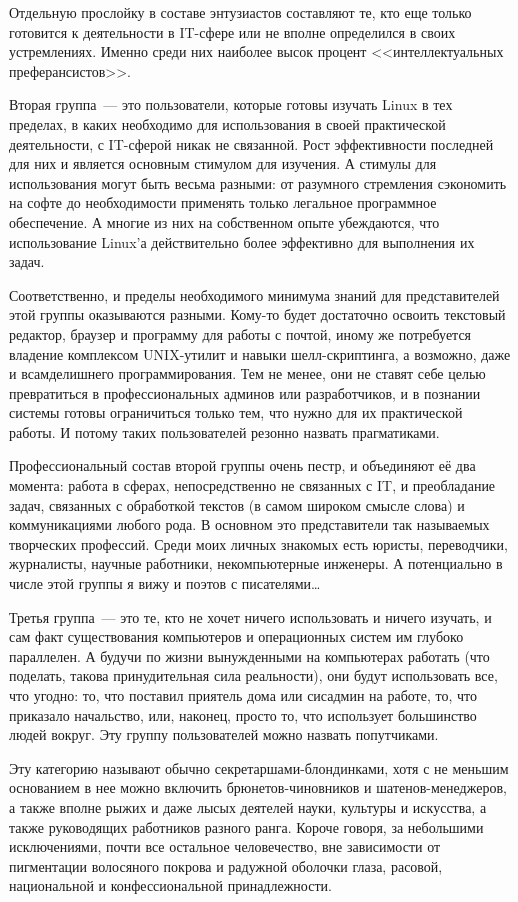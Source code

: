 Отдельную прослойку в составе энтузиастов составляют те, кто еще только готовится к деятельности в IT-сфере или не вполне определился в своих устремлениях. Именно среди них наиболее высок процент <<интеллектуальных преферансистов>>.

Вторая группа~--- это пользователи, которые готовы изучать Linux в тех пределах, в каких необходимо для использования в своей практической деятельности, с IT-сферой никак не связанной. Рост эффективности последней для них и является основным стимулом для изучения. А стимулы для использования могут быть весьма разными: от разумного стремления сэкономить на софте до необходимости применять только легальное программное обеспечение. А многие из них на собственном опыте убеждаются, что использование Linux'а действительно более эффективно для выполнения их задач.

Соответственно, и пределы необходимого минимума знаний для представителей этой группы оказываются разными. Кому-то будет достаточно освоить текстовый редактор, браузер и программу для работы с почтой, иному же потребуется владение комплексом UNIX-утилит и навыки шелл-скриптинга, а возможно, даже и всамделишнего программирования. Тем не менее, они не ставят себе целью превратиться в профессиональных админов или разработчиков, и в познании системы готовы ограничиться только тем, что нужно для их практической работы. И потому таких пользователей резонно назвать прагматиками.

Профессиональный состав второй группы очень пестр, и объединяют её два момента: работа в сферах, непосредственно не связанных с IT, и преобладание задач, связанных с обработкой текстов (в самом широком смысле слова) и коммуникациями любого рода. В основном это представители так называемых творческих профессий. Среди моих личных знакомых есть юристы, переводчики, журналисты, научные работники, некомпьютерные инженеры. А потенциально в числе этой группы я вижу и поэтов с писателями\dots

Третья группа~--- это те, кто не хочет ничего использовать и ничего изучать, и сам факт существования компьютеров и операционных систем им глубоко параллелен. А будучи по жизни вынужденными на компьютерах работать (что поделать, такова принудительная сила реальности), они будут использовать все, что угодно: то, что поставил приятель дома или сисадмин на работе, то, что приказало начальство, или, наконец, просто то, что использует большинство людей вокруг. Эту группу пользователей можно назвать попутчиками.

Эту категорию называют обычно секретаршами-блондинками, хотя с не меньшим основанием в нее можно включить брюнетов-чиновников и шатенов-менеджеров, а также вполне рыжих и даже лысых деятелей науки, культуры и искусства, а также руководящих работников разного ранга. Короче говоря, за небольшими исключениями, почти все остальное человечество, вне зависимости от пигментации волосяного покрова и радужной оболочки глаза, расовой, национальной и конфессиональной принадлежности.

